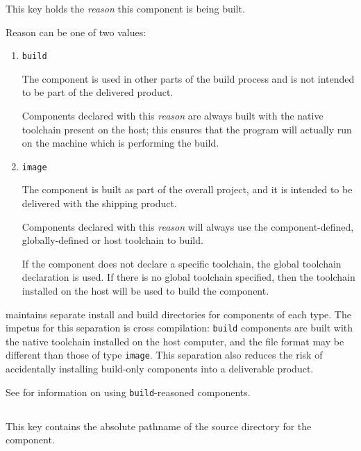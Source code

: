 This key holds the \emph{reason} this component is being built.

Reason can be one of two values:

  \begin{enumerate}
  \item \texttt{build}

    The component is used in other parts of the build process and is
    not intended to be part of the delivered product.

    Components declared with this \emph{reason} are always built with
    the native toolchain present on the host; this ensures that the
    program will actually run on the machine which is performing the
    build.

  \item \texttt{image}

    The component is built as part of the overall project, and it is
    intended to be delivered with the shipping product.

    Components declared with this \emph{reason} will always use the
    component-defined, globally-defined or host toolchain to build.

    If the component does not declare a specific toolchain, the global
    toolchain declaration is used.  If there is no global toolchain
    specified, then the toolchain installed on the host will be used
    to build the component.

  \end{enumerate}

  \lmsbw maintains separate install and build directories for
  components of each type.  The impetus for this separation is cross
  compilation: \texttt{build} components are built with the native
  toolchain installed on the host computer, and the file format may be
  different than those of type \texttt{image}.  This separation also
  reduces the risk of accidentally installing build-only components
  into a deliverable product.

  See  for information on using
  \texttt{build}-reasoned components.


\subsection{}\label{variables:source-directory}

This key contains the absolute pathname of the source directory for
the component.


